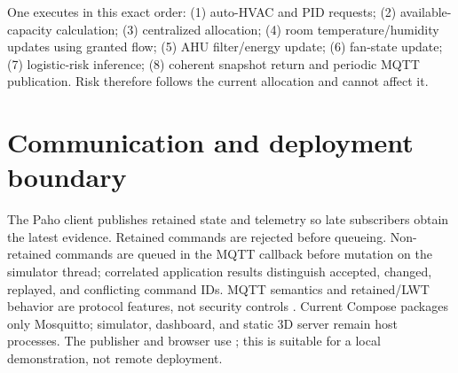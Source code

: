 One  executes in this exact order: (1) auto-HVAC and PID requests; (2) available-capacity calculation; (3) centralized allocation; (4) room temperature/humidity updates using granted flow; (5) AHU filter/energy update; (6) fan-state update; (7) logistic-risk inference; (8) coherent snapshot return and periodic MQTT publication. Risk therefore follows the current allocation and cannot affect it.

\section{Communication and deployment boundary}
The Paho client publishes retained state and telemetry so late subscribers obtain the latest evidence. Retained commands are rejected before queueing. Non-retained commands are queued in the MQTT callback before mutation on the simulator thread; correlated application results distinguish accepted, changed, replayed, and conflicting command IDs. MQTT semantics and retained/LWT behavior are protocol features, not security controls \citep{mqtt5}. Current Compose packages only Mosquitto; simulator, dashboard, and static 3D server remain host processes. The publisher and browser use ; this is suitable for a local demonstration, not remote deployment.
